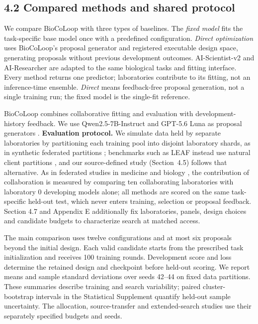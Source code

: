 \subsection*{4.2 Compared methods and shared protocol}
We compare BioCoLoop with three types of baselines. The \emph{fixed model} fits the task-specific base model once with a predefined configuration. \emph{Direct optimization} uses BioCoLoop's proposal generator and registered executable design space, generating proposals without previous development outcomes. AI-Scientist-v2 \citep{Yamada2025AIScientistV2} and AI-Researcher \citep{Tang2025AIResearcher} are adapted to the same biological tasks and fitting interface. Every method returns one predictor; laboratories contribute to its fitting, not an inference-time ensemble. \emph{Direct} means feedback-free proposal generation, not a single training run; the fixed model is the single-fit reference.

BioCoLoop combines collaborative fitting and evaluation with development-history feedback. We use Qwen2.5-7B-Instruct and GPT-5.6 Luna as proposal generators \citep{OpenAI2026GPT56Luna}. \textbf{Evaluation protocol.} We simulate data held by separate laboratories by partitioning each training pool into disjoint laboratory shards, as in synthetic federated partitions \citep{McMahan2017,He2020FedML}; benchmarks such as LEAF instead use natural client partitions \citep{Caldas2018LEAF}, and our source-defined study (Section~4.5) follows that alternative. As in federated studies in medicine and biology \citep{Sheller2020,Chang2018Distributed,Dayan2021FederatedCOVID,Terrail2022FLamby,WarnatHerresthal2021Swarm,Wang2024scFed}, the contribution of collaboration is measured by comparing ten collaborating laboratories with laboratory 0 developing models alone; all methods are scored on the same task-specific held-out test, which never enters training, selection or proposal feedback. Section 4.7 and Appendix E additionally fix laboratories, panels, design choices and candidate budgets to characterize search at matched access.

The main comparison uses twelve configurations and at most six proposals beyond the initial design. Each valid candidate starts from the prescribed task initialization and receives 100 training rounds. Development score and loss determine the retained design and checkpoint before held-out scoring. We report means and sample standard deviations over seeds 42--44 on fixed data partitions. These summaries describe training and search variability; paired cluster-bootstrap intervals in the Statistical Supplement quantify held-out sample uncertainty. The allocation, source-transfer and extended-search studies use their separately specified budgets and seeds.
